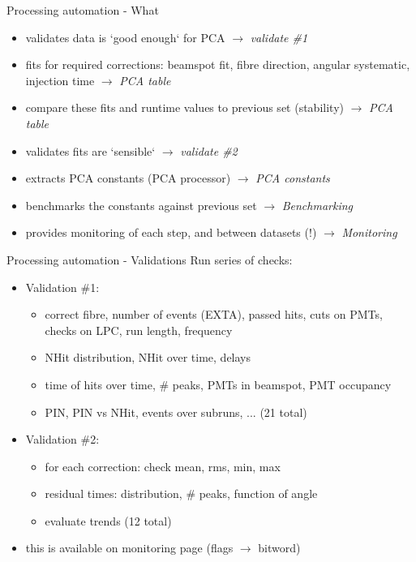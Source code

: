 \documentclass[xcolor=table]{beamer}
\begin{document}
\begin{frame}{Processing automation - What}
\begin{itemize}
	\item validates data is `good enough` for PCA $\rightarrow$ \textit{validate \#1}
	\item fits for required corrections: beamspot fit, fibre direction, angular systematic, injection time $\rightarrow$ \textit{PCA table}
	\item compare these fits and runtime values to previous set (stability) $\rightarrow$ \textit{PCA table}
	\item validates fits are `sensible` $\rightarrow$ \textit{validate \#2}
	\item extracts PCA constants (PCA processor) $\rightarrow$ \textit{PCA constants}
	\item benchmarks the constants against previous set $\rightarrow$ \textit{Benchmarking}
	\item provides monitoring of each step, and between datasets (!) $\rightarrow$ \textit{Monitoring}
\end{itemize}
\end{frame}

\begin{frame}{Processing automation - Validations}
Run series of checks:
\begin{itemize}
	\item Validation \#1:
	\begin{itemize}
		\item correct fibre, number of events (EXTA), passed hits, cuts on PMTs, checks on LPC, run length, frequency
		\item NHit distribution, NHit over time, delays
		\item time of hits over time, \# peaks, PMTs in beamspot, PMT occupancy
		\item PIN, PIN vs NHit, events over subruns, ... (21 total)
	\end{itemize}
	\item Validation \#2:
		\begin{itemize}
		\item for each correction: check mean, rms, min, max 
		\item residual times: distribution, \# peaks, function of angle
		\item evaluate trends (12 total)
	\end{itemize}
	\item this is available on monitoring page (flags $\rightarrow$ bitword)
\end{itemize}
\end{frame}
\end{document}
